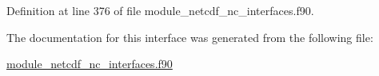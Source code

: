 Definition at line 376 of file module\+\_\+netcdf\+\_\+nc\+\_\+interfaces.\+f90.



The documentation for this interface was generated from the following file\+:\begin{DoxyCompactItemize}
\item 
\hyperlink{module__netcdf__nc__interfaces_8f90}{module\+\_\+netcdf\+\_\+nc\+\_\+interfaces.\+f90}\end{DoxyCompactItemize}
